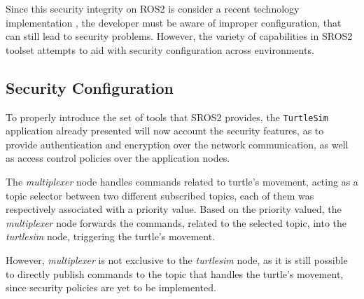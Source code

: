 Since this security integrity on ROS2 is consider a recent technology implementation \cite{ros-dds-integration}, the developer must be aware of improper configuration, that can still lead to security problems. However, the variety of capabilities in SROS2 toolset attempts to aid with security configuration across environments. 

\subsection{Security Configuration}

To properly introduce the set of tools that SROS2 provides, the \texttt{TurtleSim} application already presented will now account the security features, as to provide authentication and encryption over the network communication, as well as access control policies over the application nodes. 
            
The \textit{multiplexer} node handles commands related to turtle's movement, acting as a topic selector between two different subscribed topics, each of them was respectively associated with a priority value. Based on the priority valued, the \textit{multiplexer} node forwards the commands, related to the selected topic, into the \textit{turtlesim} node, triggering the turtle's movement. 

However, \textit{multiplexer} is not exclusive to the \textit{turtlesim} node, as it is still possible to directly publish commands to the topic that handles the turtle's movement, since security policies are yet to be implemented.




